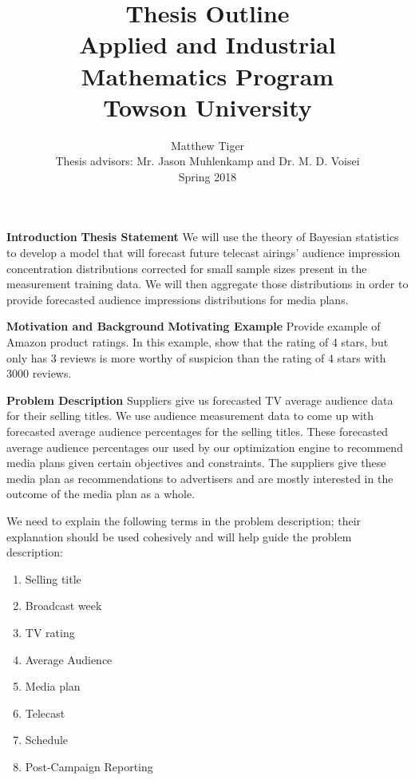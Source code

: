 \documentclass{article}
\title{Thesis Outline \\ Applied and Industrial Mathematics Program \\ Towson University}
\author{Matthew Tiger \\ Thesis advisors:  Mr. Jason Muhlenkamp and Dr. M. D. Voisei \\ Spring 2018}
\begin{document}
\maketitle

\begin{outline}[enumerate]
    \1 \textbf{Introduction}
        \2 \textbf{Thesis Statement}
            We will use the theory of Bayesian statistics to develop a model that
            will forecast future telecast airings' audience impression concentration
            distributions corrected for small sample sizes present in the measurement
            training data. We will then aggregate those distributions in order to provide forecasted
            audience impressions distributions for media plans.

    \1 \textbf{Motivation and Background}
        \2 \textbf{Motivating Example}
            Provide example of Amazon product ratings. In this example, show that the rating of 4 stars,
            but only has 3 reviews is more worthy of suspicion than the rating of 4 stars with 3000 reviews.

        \2 \textbf{Problem Description}
            Suppliers give us forecasted TV average audience data for their selling titles. We use
            audience measurement data to come up with forecasted average audience percentages for the selling titles.
            These forecasted average audience percentages our used by our optimization engine to recommend media plans
            given certain objectives and constraints. The suppliers give these media plan as recommendations to
            advertisers and are mostly interested in the outcome of the media plan as a whole.

            We need to explain the following terms in the problem description; their explanation should be used
            cohesively and will help guide the problem description:
            \begin{enumerate}
            \item Selling title
            \item Broadcast week
            \item TV rating
            \item Average Audience
            \item Media plan
            \item Telecast
            \item Schedule
            \item Post-Campaign Reporting
            \end{enumerate}


\end{outline}
\end{document}

